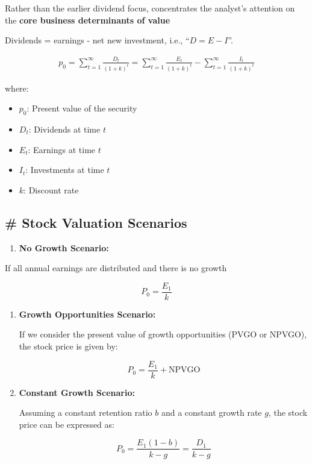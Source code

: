 \documentclass[
]{book}
\providecommand{\tightlist}{%
  \setlength{\itemsep}{0pt}\setlength{\parskip}{0pt}}
\begin{document}
Rather than the earlier dividend focus, concentrates the analyst's attention on the \textbf{core business determinants of value}

Dividends = earnings - net new investment, i.e., ``\(D = E - I\)''.

\[
\begin{align}
p_0 = \sum_{t=1}^{\infty} \frac{D_t}{(1+k)^t} = \sum_{t=1}^{\infty} \frac{E_t}{(1+k)^t} - \sum_{t=1}^{\infty} \frac{I_t}{(1+k)^t}
\end{align}
\]

where:

\begin{itemize}
\tightlist
\item
  \(p_0\): Present value of the security
\item
  \(D_t\): Dividends at time \(t\)
\item
  \(E_t\): Earnings at time \(t\)
\item
  \(I_t\): Investments at time \(t\)
\item
  \(k\): Discount rate
\end{itemize}

\hypertarget{stock-valuation-scenarios}{%
\subsection{\# Stock Valuation Scenarios}\label{stock-valuation-scenarios}}

\begin{enumerate}
\def\labelenumi{\arabic{enumi}.}
\tightlist
\item
  \textbf{No Growth Scenario:}
\end{enumerate}

If all annual earnings are distributed and there is no growth

\[
   P_0 = \frac{E_1}{k}
   \]

\begin{enumerate}
\def\labelenumi{\arabic{enumi}.}
\setcounter{enumi}{1}
\item
  \textbf{Growth Opportunities Scenario:}

  If we consider the present value of growth opportunities (PVGO or NPVGO), the stock price is given by:

  \[
  P_0 = \frac{E_1}{k} + \text{NPVGO}
  \]
\item
  \textbf{Constant Growth Scenario:}

  Assuming a constant retention ratio \(b\) and a constant growth rate \(g\), the stock price can be expressed as:

  \[
  P_0 = \frac{E_1 (1 - b)}{k - g} = \frac{D_1}{k - g}
  \]
\end{enumerate}
\end{document}

